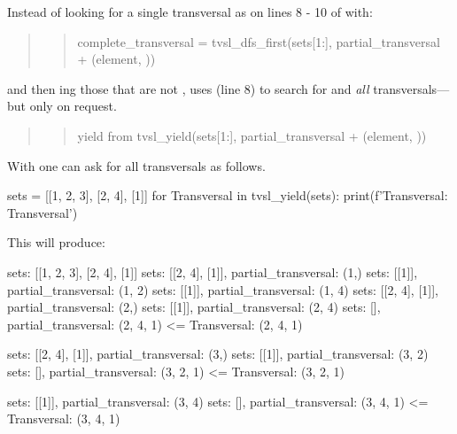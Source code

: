 Instead of looking for a single transversal as on lines 8 - 10 of  with:
\begin{quote}
\begin{quote}
\begin{python}
complete_transversal = tvsl_dfs_first(sets[1:], partial_transversal + (element, ))
\end{python}
\end{quote}
\end{quote}

and then ing those that are not ,  uses  (line 8) to search for and  \textit{all} transversals---but only on request.

\begin{quote}
\begin{quote}
\begin{python}
yield from tvsl_yield(sets[1:], partial_transversal + (element, ))
\end{python}
\end{quote}
\end{quote}

With  one can ask for all transversals as follows. 

\begin{minipage}{\linewidth} \largev 
\begin{python}
sets = [[1, 2, 3], [2, 4], [1]]
for Transversal in tvsl_yield(sets):
    print(f'Transversal: {Transversal}\n')
\end{python}
\end{minipage}

This will produce:

\begin{minipage}{\linewidth} \largev
\begin{python}
sets: [[1, 2, 3], [2, 4], [1]]
  sets: [[2, 4], [1]], partial_transversal: (1,)
    sets: [[1]], partial_transversal: (1, 2)
    sets: [[1]], partial_transversal: (1, 4)
  sets: [[2, 4], [1]], partial_transversal: (2,)
    sets: [[1]], partial_transversal: (2, 4)
      sets: [], partial_transversal: (2, 4, 1) <=
Transversal: (2, 4, 1)

  sets: [[2, 4], [1]], partial_transversal: (3,)
    sets: [[1]], partial_transversal: (3, 2)
      sets: [], partial_transversal: (3, 2, 1) <=
Transversal: (3, 2, 1)

    sets: [[1]], partial_transversal: (3, 4)
      sets: [], partial_transversal: (3, 4, 1) <=
Transversal: (3, 4, 1)
\end{python}
\end{minipage}



